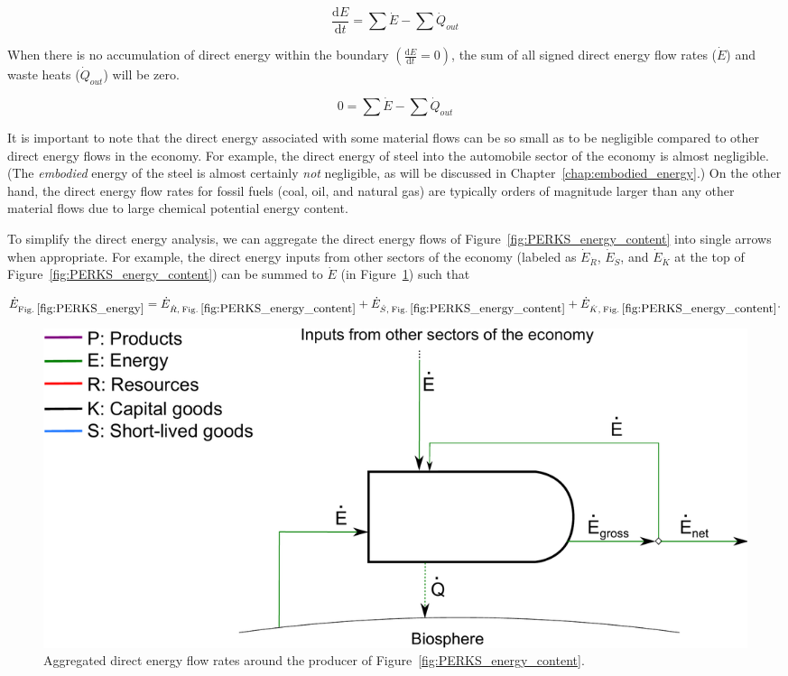 \begin{equation} \label{eq:First_Law_with_accumulation}
	\frac{\mathrm{d}E}{\mathrm{d}t} = \sum \dot{E} - \sum \dot{Q}_{out}
\end{equation}

When there is no accumulation of direct energy within the boundary
$\left( \frac{\mathrm{d}E}{\mathrm{d}t} = 0 \right)$, the sum of all 
signed direct energy flow rates ($\dot{E}$) 
and waste heats ($\dot{Q}_{out}$) will be zero.

\begin{equation} \label{eq:First_Law_no_accumulation}
	0 = \sum \dot{E} - \sum \dot{Q}_{out}
\end{equation}

It is important to note that the direct energy associated with some material flows can
be so small as to be negligible compared to other direct energy flows in the economy.
For example, the direct energy of steel into the automobile sector of the economy 
is almost negligible. (The \emph{embodied} energy of the steel is almost certainly
\emph{not} negligible, as will be discussed in Chapter~\ref{chap:embodied_energy}.)
On the other hand, the direct energy flow rates for 
fossil fuels
(coal, oil, and natural gas)
are typically orders of magnitude larger than any other 
material flows due to large chemical potential energy content.

To simplify the direct energy analysis, 
we can aggregate the direct energy flows of Figure~\ref{fig:PERKS_energy_content}
into single arrows when appropriate. 
For example, the direct energy inputs from other sectors of the economy
(labeled as $\dot{E}_{\dot{R}}$, $\dot{E}_{\dot{S}}$, and $\dot{E}_{\dot{K}}$ 
at the top of Figure~\ref{fig:PERKS_energy_content}) can be summed to $\dot{E}$ 
(in Figure~\ref{fig:PERKS_energy}) such that

\begin{equation} \label{eq:direct_energy_aggregation}
	\dot{E}_{\mathrm{Fig. \: \ref{fig:PERKS_energy}}} 
	= \dot{E}_{\dot{R}, \: \mathrm{Fig. \: \ref{fig:PERKS_energy_content}}} 
	+ \dot{E}_{\dot{S}, \: \mathrm{Fig. \: \ref{fig:PERKS_energy_content}}} 
	+ \dot{E}_{\dot{K}, \: \mathrm{Fig. \: \ref{fig:PERKS_energy_content}}}.
\end{equation}

\begin{figure}[h!]
\centering
\includegraphics[width=0.8\linewidth]{Part_2/Chapter_Energy/images/PERKS_basic_unit_energy.pdf}
\caption{Aggregated direct energy flow rates around 
the producer of Figure~\ref{fig:PERKS_energy_content}.}
\label{fig:PERKS_energy}
\end{figure}


